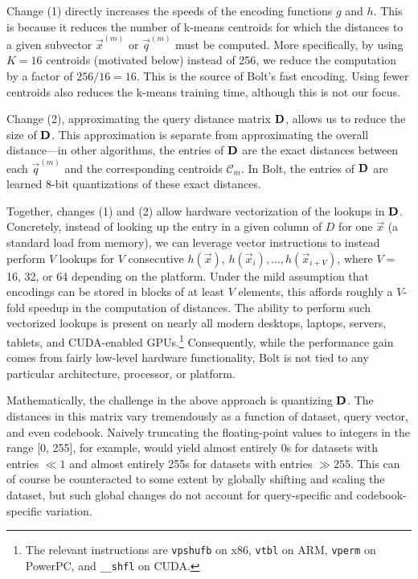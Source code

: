 Change (1) directly increases the speeds of the encoding functions $g$ and $h$. This is because it reduces the number of k-means centroids for which the distances to a given subvector $\vec{x}^{(m)}$ or $\vec{q}^{(m)}$ must be computed. More specifically, by using $K = 16$ centroids (motivated below) instead of 256, we reduce the computation by a factor of $256 / 16 = 16$. This is the source of Bolt's fast encoding. Using fewer centroids also reduces the k-means training time, although this is not our focus.

Change (2), approximating the query distance matrix $\mathbf{D}$, allows us to reduce the size of $\mathbf{D}$. This approximation is separate from approximating the overall distance---in other algorithms, the entries of $\mathbf{D}$ are the exact distances between each $\vec{q}^{(m)}$ and the corresponding centroids $\mathcal{C}_m$. In Bolt, the entries of $\mathbf{D}$ are learned 8-bit quantizations of these exact distances.

Together, changes (1) and (2) allow hardware vectorization of the lookups in $\mathbf{D}$. Concretely, instead of looking up the entry in a given column of $D$ for one $\vec{x}$ (a standard load from memory), we can leverage vector instructions to instead perform $V$ lookups for $V$ consecutive $h(\vec{x})$, $h(\vec{x}_i),\ldots,h(\vec{x}_{i+V})$, where $V = $ 16, 32, or 64 depending on the platform. Under the mild assumption that encodings can be stored in blocks of at least $V$ elements, this affords roughly a $V$-fold speedup in the computation of distances. The ability to perform such vectorized lookups is present on nearly all modern desktops, laptops, servers, tablets, and CUDA-enabled GPUs.\footnote{The relevant instructions are \texttt{vpshufb} on x86, \texttt{vtbl} on ARM, \texttt{vperm} on PowerPC, and \texttt{\_\_shfl} on CUDA.} Consequently, while the performance gain comes from fairly low-level hardware functionality, Bolt is not tied to any particular architecture, processor, or platform.

Mathematically, the challenge in the above approach is quantizing $\mathbf{D}$. The distances in this matrix vary tremendously as a function of dataset, query vector, and even codebook. Naively truncating the floating-point values to integers in the range [0, 255], for example, would yield almost entirely 0s for datasets with entries $ \ll 1$ and almost entirely 255s for datasets with entries $ \gg 255$. This can of course be counteracted to some extent by globally shifting and scaling the dataset, but such global changes do not account for query-specific and codebook-specific variation.

